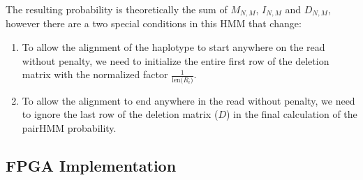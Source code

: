 \documentclass[11pt, oneside]{article}
\begin{document}
    The resulting probability is theoretically the sum of $M_{N,M}$, $I_{N,M}$
    and $D_{N,M}$, however there are a two special conditions in this HMM that
    change:

    \begin{enumerate}
    
        \item To allow the alignment of the haplotype to start anywhere on the read
        without penalty, we need to initialize the entire first row of the
        deletion matrix with the normalized factor
        $\frac{1}{\text{len(}R_i\text{)}}$.

        \item To allow the alignment to end anywhere in the read without penalty, we
        need to ignore the last row of the deletion matrix ($D$) in the final
        calculation of the pairHMM probability.

    \end{enumerate}
	
	\subsection{FPGA Implementation} 
	
\end{document}
